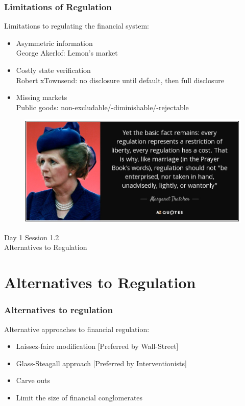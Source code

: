 \documentclass[11pt]{beamer}
\begin{document}
\begin{frame}
\frametitle{Limitations of Regulation}
Limitations to regulating the financial system:
\begin{itemize}\itemsep10pt
\item Asymmetric information\\
\quad \quad George Akerlof: Lemon's market
\item Costly state verification\\
\quad \quad Robert xTownsend: no disclosure until default, then full disclosure
\item Missing markets\\
\quad \quad Public goods: non-excludable/-diminishable/-rejectable
\end{itemize}
\end{frame}
\begin{frame}
\begin{figure}
\includegraphics[width=\textwidth]{mthatch.png}
\end{figure}
\end{frame}

%

\begin{frame}
\begin{center}
 Day 1 Session 1.2\\
 Alternatives to Regulation
\end{center}
\end{frame}

\section{Alternatives to Regulation}
%
\begin{frame}
\frametitle{Alternatives to regulation}
Alternative approaches to financial regulation:
\begin{itemize}\itemsep10pt
\item Laissez-faire modification [Preferred by Wall-Street]
\item Glass-Steagall approach [Preferred by Interventionists]
\item Carve outs
\item Limit the size of financial conglomerates
\end{itemize}
\end{frame}
\end{document}
